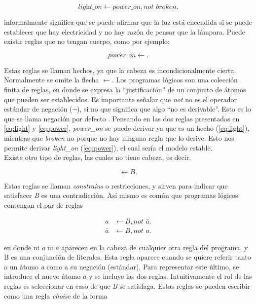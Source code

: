 \begin{equation}\label{eq:light}
	\textit{light\_on} \leftarrow \textit{power\_on}, \textit{not } broken.
\end{equation}

informalmente significa que se puede afirmar que la luz está encendida si se puede establecer que hay electricidad y no hay razón de pensar que la lámpara. Puede existir reglas que no tengan cuerpo,  como por ejemplo:

\begin{equation}\label{eq:power}
	\textit{power\_on} \leftarrow.
\end{equation}

Estas reglas se llaman hechos, ya que la cabeza es incondicionalmente cierta. Normalmente se omite la flecha $\leftarrow$. Los programas lógicos son una colección finita de reglas, en donde se expresa la ``justificación'' de un conjunto de átomos que pueden ser establecidos. Es importante señalar que \textit{not} no es el operador estándar de negación ($\lnot$), si no que significa que algo ``no es derivable''. Esto es lo que se llama negación por defecto \cite{negation}. Pensando en las dos reglas presentadas en \ref{eq:light} y \ref{eq:power}, \textit{power\_on} se puede derivar ya que es un hecho (\ref{eq:light}), mientras que \textit{broken} no porque no hay ninguna regla que lo derive. Esto nos permite derivar \textit{light\_on} (\ref{eq:power}), el cual sería el modelo estable. \\

Existe otro tipo de reglas, las cuales no tiene cabeza, es decir,

\begin{equation}
	\leftarrow B.
\end{equation}

Estas reglas se llaman \textit{constrains} o restricciones, y sirven para indicar que satisfacer \textit{B} es una contradicción. Así mismo es común que programas lógicos contengan el par de reglas

\begin{align}
	a &\leftarrow B, \textit{not } \bar{a}.\\
	\bar{a} &\leftarrow B, \textit{not } a.
\end{align}

en donde ni \textit{a} ni $\bar{a}$ aparecen en la cabeza de cualquier otra regla del programa, y B es una conjunción de literales. Esta regla aparece cuando se quiere referir tanto a un átomo \textit{a} como a su negación (estándar). Para representar este último, se introduce el nuevo átomo $\bar{a}$ y se incluye las dos reglas. Intuitivamente el rol de las reglas es seleccionar en caso de que \textit{B} se satisfaga. Estas reglas se pueden escribir como una regla \textit{choise} de la forma

